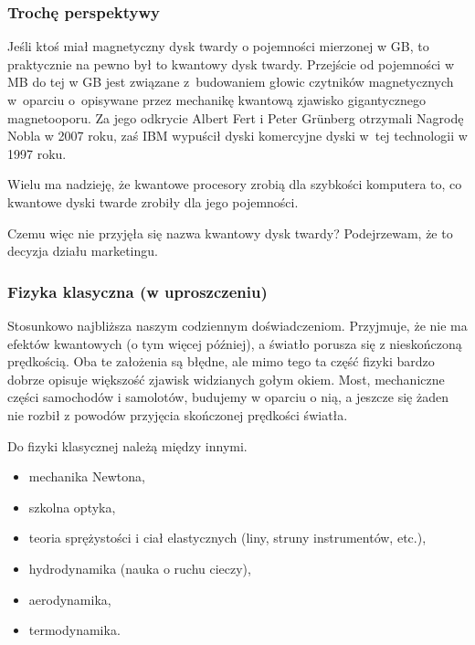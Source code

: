 \documentclass[10pt,t]{beamer}
\begin{document}
\begin{frame}
  \frametitle{Trochę perspektywy}


  Jeśli ktoś miał magnetyczny dysk twardy o pojemności mierzonej w GB,
  to praktycznie na pewno był to kwantowy dysk twardy. Przejście od
  pojemności w MB do tej w GB jest związane z~budowaniem głowic
  czytników magnetycznych w~oparciu o~opisywane przez mechanikę
  kwantową zjawisko gigantycznego magnetooporu. Za jego odkrycie
  Albert Fert i Peter Gr\"{u}nberg otrzymali Nagrodę Nobla w 2007
  roku, zaś IBM wypuścił dyski komercyjne dyski w~tej technologii w
  1997 roku.

  Wielu ma nadzieję, że kwantowe procesory zrobią dla szybkości
  komputera to, co kwantowe dyski twarde zrobiły dla jego pojemności.

  Czemu więc nie przyjęła się nazwa kwantowy dysk twardy? Podejrzewam,
  że to decyzja działu marketingu.

\end{frame}





\begin{frame}
  \frametitle{Fizyka klasyczna (w uproszczeniu)}


  Stosunkowo najbliższa naszym codziennym doświadczeniom. Przyjmuje,
  że nie ma efektów kwantowych (o tym więcej później), a światło
  porusza się z nieskończoną prędkością. Oba te założenia są błędne,
  ale mimo tego ta część fizyki bardzo dobrze opisuje większość
  zjawisk widzianych gołym okiem. Most, mechaniczne części samochodów
  i samolotów, budujemy w oparciu o nią, a jeszcze się żaden nie
  rozbił z powodów przyjęcia skończonej prędkości światła.

  Do fizyki klasycznej należą między innymi.
  \begin{itemize}
    \RaggedRight

  \item mechanika Newtona,

  \item szkolna optyka,

  \item teoria sprężystości i ciał elastycznych (liny, struny
    instrumentów, etc.),

  \item hydrodynamika (nauka o ruchu cieczy),

  \item aerodynamika,

  \item termodynamika.

  \end{itemize}

\end{frame}
\end{document}
